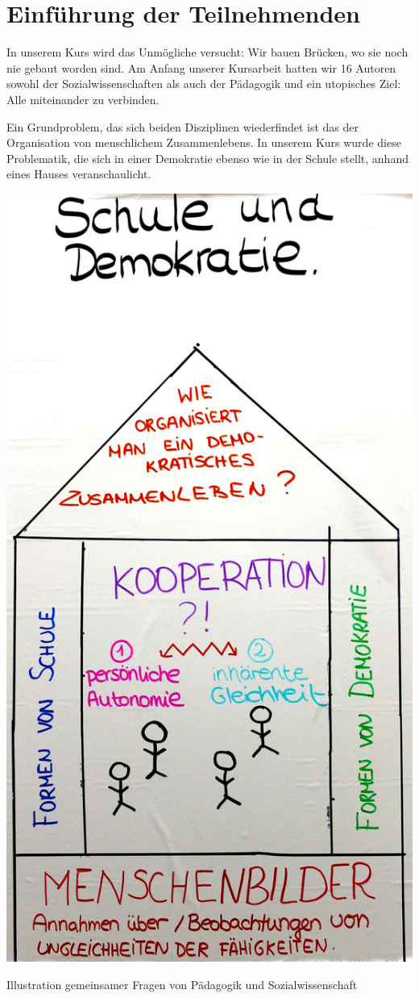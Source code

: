 \section[Einführung]{Einführung der Teilnehmenden}

In unserem Kurs wird das Unmögliche versucht:
Wir bauen Brücken, wo sie noch nie gebaut worden sind.
Am Anfang unserer Kursarbeit hatten wir 16 Autoren sowohl der Sozialwissenschaften als auch der Pädagogik und ein utopisches Ziel:
Alle miteinander zu verbinden.

Ein Grundproblem, das sich beiden Disziplinen wiederfindet ist das der Organisation von menschlichem Zusammenlebens.
In unserem Kurs wurde diese Problematik, die sich in einer Demokratie ebenso wie in der Schule stellt, anhand eines Hauses veranschaulicht.

\begin{dsafigure}
	\begin{center}
	\includegraphics[width=0.9\columnwidth]{img/Kooperationshaus.JPG}
	\caption{Illustration gemeinsamer Fragen von Pädagogik und Sozialwissenschaft}
	\label{fig:kooperationshaus}
	\end{center}
\end{dsafigure}

